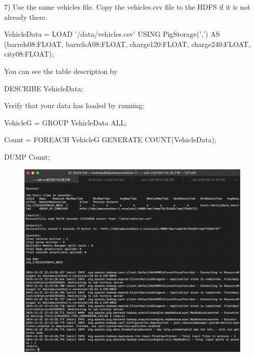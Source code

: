 \documentclass{article}
\begin{document}
7) Use the same vehicles file. Copy the vehicles.csv file to the HDFS if it is not already there.

VehicleData = LOAD '/data/vehicles.csv' USING PigStorage(',') AS (barrels08:FLOAT, barrelsA08:FLOAT, charge120:FLOAT, charge240:FLOAT, city08:FLOAT);

You can see the table description by

DESCRIBE VehicleData;

Verify that your data has loaded by running:

VehicleG = GROUP VehicleData ALL;

Count = FOREACH VehicleG GENERATE COUNT(VehicleData);

DUMP Count;

\begin{figure}[H]
  \centering
  \includegraphics[width=\textwidth]{image14.png}
\end{figure}
\end{document}
